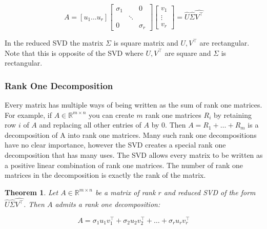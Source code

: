 \documentclass{article}
\newtheorem{theorem}{Theorem}
\begin{document}
$$A=[ u_1 \dots u_r]\begin{bmatrix}\sigma_1&&0 \\&\ddots\\0&&\sigma_r\end{bmatrix}\begin{bmatrix}v_1\\\vdots \\ v_r\end{bmatrix}=\hat{U}\hat{\Sigma}\hat{V^\top}$$

In the reduced SVD the matrix $\Sigma$ is square matrix and $U,V^\top$ are rectangular. Note that this is opposite of the SVD where $U,V^\top$ are square and $\Sigma$ is rectangular.

\subsubsection{Rank One Decomposition}
Every matrix has multiple ways of being written as the sum of rank one matrices. For example, if $A\in\mathbb{R}^{m\times n}$ you can create $m$ rank one matrices $R_i$ by retaining row $i$ of $A$ and replacing all other entries of $A$ by 0. Then $A=R_1+\dots+R_m$ is a decomposition of A into rank one matrices. Many such rank one decompositions have no clear importance, however the SVD creates a special rank one decomposition that has many uses. The SVD allows
every matrix to be written as a positive linear combination of rank one matrices. The number of rank one
matrices in the decomposition is exactly the rank of the matrix.

\begin{theorem}
Let $A\in\mathbb{R}^{m\times n}$ be a matrix of rank $r$ and reduced SVD of the form $\hat{U}\hat{\Sigma}\hat{V^\top}$. Then $A$ admits a rank one decomposition:

$$A=\sigma_1u_1v^\top_1+\sigma_2u_2v^\top_2+\dots+\sigma_ru_rv^\top_r$$
\end{theorem}
\end{document}
